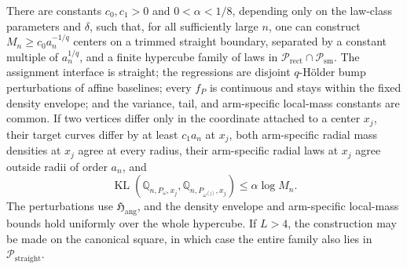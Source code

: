 There are constants \(c_0,c_1>0\) and \(0<\alpha<1/8\), depending only on the law-class parameters and \(\delta\), such that, for all sufficiently large \(n\), one can construct \(M_n\geq c_0a_n^{-1/q}\) centers on a trimmed straight boundary, separated by a constant multiple of \(a_n^{1/q}\), and a finite hypercube family of laws in \(\mathcal P_{\mathrm{rect}}\cap\mathcal P_{\mathrm{sm}}\).  The assignment interface is straight; the regressions are disjoint \(q\)-H\"older bump perturbations of affine baselines; every \(f_P\) is continuous and stays within the fixed density envelope; and the variance, tail, and arm-specific local-mass constants are common.  If two vertices differ only in the coordinate attached to a center \(x_j\), their target curves differ by at least \(c_1a_n\) at \(x_j\), both arm-specific radial mass densities at \(x_j\) agree at every radius, their arm-specific radial laws at \(x_j\) agree outside radii of order \(a_n\), and
\[
 \operatorname{KL}\!\left(\mathbb Q_{n,P_\omega,x_j},\mathbb Q_{n,P_{\omega^{(j)}},x_j}\right)
 \leq\alpha\log M_n.
\]
The perturbations use \(\mathfrak H_{\mathrm{ang}}\), and the density envelope and arm-specific local-mass bounds hold uniformly over the whole hypercube.  If \(L>4\), the construction may be made on the canonical square, in which case the entire family also lies in \(\mathcal P_{\mathrm{straight}}\).